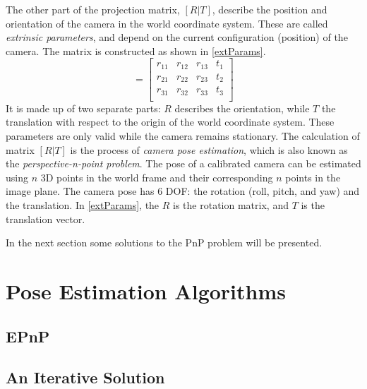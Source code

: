 The other part of the projection matrix, $[R | T]$, describe the position and orientation of the camera in the world coordinate system.
These are called \textit{extrinsic parameters}, and depend on the current configuration (position) of the camera.
The matrix is constructed as shown in \eqref{extParams}.
\begin{equation}
	[R | T] =
	\begin{bmatrix}
		r_{11} & r_{12} & r_{13} & t_1\\
		r_{21} & r_{22} & r_{23} & t_2\\
		r_{31} & r_{32} & r_{33} & t_3\\
	\end{bmatrix}
	\label{eq:extParams}
\end{equation}
It is made up of two separate parts: $R$ describes the orientation, while $T$ the translation with respect to the origin of the world coordinate system.
These parameters are only valid while the camera remains stationary.
The calculation of matrix $[R|T]$ is the process of \textit{camera pose estimation}, which is also known as the \textit{perspective-n-point problem}.
The pose of a calibrated camera can be estimated using $n$ 3D points in the world frame and their corresponding $n$ points in the image plane.
The camera pose has 6 DOF: the rotation (roll, pitch, and yaw) and the translation.
In \eqref{extParams}, the $R$ is the rotation matrix, and $T$ is the translation vector.

In the next section some solutions to the PnP problem will be presented.

\section{Pose Estimation Algorithms}

\subsection{EPnP}

\subsection{An Iterative Solution}

